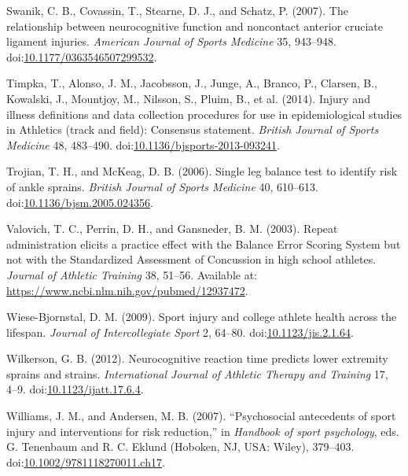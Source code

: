\documentclass[
  english,
  man]{apa6}
\newlength{\cslhangindent}
\newenvironment{cslreferences}%
  {\setlength{\parindent}{0pt}%
  \everypar{\setlength{\hangindent}{\cslhangindent}}\ignorespaces}%
  {\par}
\begin{document}
\begin{cslreferences}
\leavevmode\hypertarget{ref-Swanik2007}{}%
Swanik, C. B., Covassin, T., Stearne, D. J., and Schatz, P. (2007). The relationship between neurocognitive function and noncontact anterior cruciate ligament injuries. \emph{American Journal of Sports Medicine} 35, 943--948. doi:\href{https://doi.org/10.1177/0363546507299532}{10.1177/0363546507299532}.

\leavevmode\hypertarget{ref-Timpka2014}{}%
Timpka, T., Alonso, J. M., Jacobsson, J., Junge, A., Branco, P., Clarsen, B., Kowalski, J., Mountjoy, M., Nilsson, S., Pluim, B., et al. (2014). Injury and illness definitions and data collection procedures for use in epidemiological studies in Athletics (track and field): Consensus statement. \emph{British Journal of Sports Medicine} 48, 483--490. doi:\href{https://doi.org/10.1136/bjsports-2013-093241}{10.1136/bjsports-2013-093241}.

\leavevmode\hypertarget{ref-Trojian2006}{}%
Trojian, T. H., and McKeag, D. B. (2006). Single leg balance test to identify risk of ankle sprains. \emph{British Journal of Sports Medicine} 40, 610--613. doi:\href{https://doi.org/10.1136/bjsm.2005.024356}{10.1136/bjsm.2005.024356}.

\leavevmode\hypertarget{ref-Valovich2003}{}%
Valovich, T. C., Perrin, D. H., and Gansneder, B. M. (2003). Repeat administration elicits a practice effect with the Balance Error Scoring System but not with the Standardized Assessment of Concussion in high school athletes. \emph{Journal of Athletic Training} 38, 51--56. Available at: \url{https://www.ncbi.nlm.nih.gov/pubmed/12937472}.

\leavevmode\hypertarget{ref-Wiese-Bjornstal2009}{}%
Wiese-Bjornstal, D. M. (2009). Sport injury and college athlete health across the lifespan. \emph{Journal of Intercollegiate Sport} 2, 64--80. doi:\href{https://doi.org/10.1123/jis.2.1.64}{10.1123/jis.2.1.64}.

\leavevmode\hypertarget{ref-Wilkerson2012a}{}%
Wilkerson, G. B. (2012). Neurocognitive reaction time predicts lower extremity sprains and strains. \emph{International Journal of Athletic Therapy and Training} 17, 4--9. doi:\href{https://doi.org/10.1123/ijatt.17.6.4}{10.1123/ijatt.17.6.4}.

\leavevmode\hypertarget{ref-Williams2007}{}%
Williams, J. M., and Andersen, M. B. (2007). ``Psychosocial antecedents of sport injury and interventions for risk reduction,'' in \emph{Handbook of sport psychology}, eds. G. Tenenbaum and R. C. Eklund (Hoboken, NJ, USA: Wiley), 379--403. doi:\href{https://doi.org/10.1002/9781118270011.ch17}{10.1002/9781118270011.ch17}.


\end{cslreferences}
\end{document}
